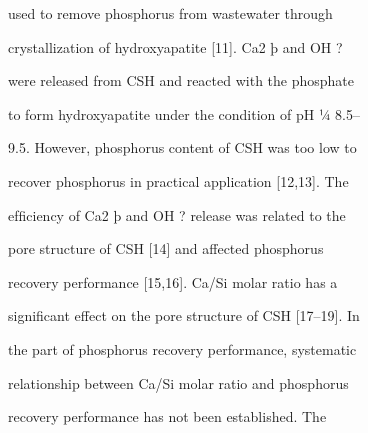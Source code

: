 \documentclass[a4paper,portrait,12pt]{article}
\begin{document}
\begin{flushleft}
used to remove phosphorus from wastewater through
\end{flushleft}


\begin{flushleft}
crystallization of hydroxyapatite [11]. Ca2 þ and OH ?
\end{flushleft}


\begin{flushleft}
were released from CSH and reacted with the phosphate
\end{flushleft}


\begin{flushleft}
to form hydroxyapatite under the condition of pH ¼ 8.5--
\end{flushleft}


\begin{flushleft}
9.5. However, phosphorus content of CSH was too low to
\end{flushleft}


\begin{flushleft}
recover phosphorus in practical application [12,13]. The
\end{flushleft}


\begin{flushleft}
efﬁciency of Ca2 þ and OH ? release was related to the
\end{flushleft}


\begin{flushleft}
pore structure of CSH [14] and affected phosphorus
\end{flushleft}


\begin{flushleft}
recovery performance [15,16]. Ca/Si molar ratio has a
\end{flushleft}


\begin{flushleft}
signiﬁcant effect on the pore structure of CSH [17--19]. In
\end{flushleft}


\begin{flushleft}
the part of phosphorus recovery performance, systematic
\end{flushleft}


\begin{flushleft}
relationship between Ca/Si molar ratio and phosphorus
\end{flushleft}


\begin{flushleft}
recovery performance has not been established. The
\end{flushleft}
\end{document}
